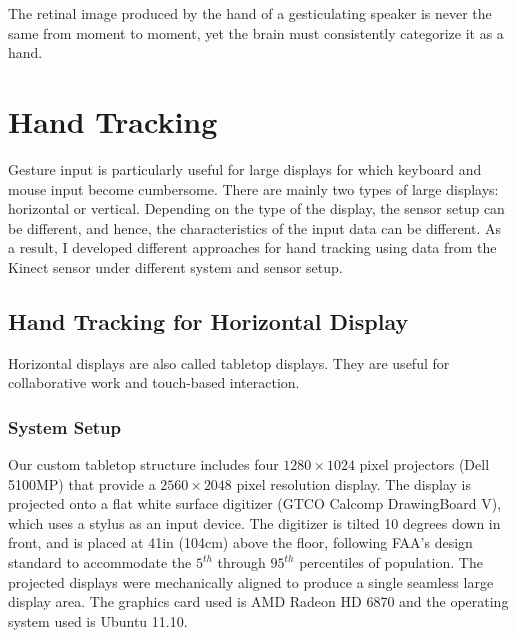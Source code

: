 \begin{savequote}
The retinal image produced by the hand of a gesticulating
speaker is never the same from moment to moment, yet the brain must consistently categorize
it as a hand. 
\end{savequote}
\chapter{Hand Tracking}

% 

Gesture input is particularly useful for large displays for which
keyboard and mouse input become cumbersome. There are mainly two types of
large displays: horizontal or vertical. Depending on the type of the display,
the sensor setup can be different, and hence, the characteristics of the input
data can be different. As a result, I developed different approaches for hand
tracking using data from the Kinect sensor under different system and sensor
setup.

\section{Hand Tracking for Horizontal Display}
Horizontal displays are also called tabletop displays. They are useful for
collaborative work and touch-based interaction. 

\subsection{System Setup}
Our custom tabletop structure includes four $1280\times1024$ pixel projectors 
(Dell 5100MP) that provide a $2560\times2048$ pixel resolution display. The
display is projected onto a flat white surface digitizer (GTCO Calcomp DrawingBoard V), 
which uses a stylus as an input device. The digitizer is tilted 10 degrees down 
in front, and is placed at 41in (104cm) above the floor, following FAA's design 
standard to accommodate the $5^{th}$ through $95^{th}$ percentiles of 
population. The projected displays were mechanically aligned to produce a single 
seamless large display area. The graphics card used is AMD
Radeon HD 6870 and the operating system used is Ubuntu 11.10.

